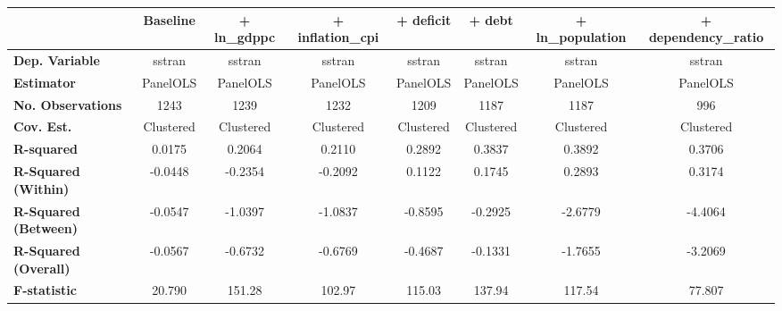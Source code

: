 \begin{center}
\begin{tabular}{lccccccc}
\toprule
                                   & \textbf{Baseline} & \textbf{+ ln\_gdppc} & \textbf{+ inflation\_cpi} & \textbf{+ deficit} & \textbf{+ debt} & \textbf{+ ln\_population} & \textbf{+ dependency\_ratio}  \\
\midrule
\textbf{Dep. Variable}             &       sstran      &        sstran        &           sstran          &       sstran       &      sstran     &           sstran          &            sstran             \\
\textbf{Estimator}                 &      PanelOLS     &       PanelOLS       &          PanelOLS         &      PanelOLS      &     PanelOLS    &          PanelOLS         &           PanelOLS            \\
\textbf{No. Observations}          &        1243       &         1239         &            1232           &        1209        &       1187      &            1187           &             996               \\
\textbf{Cov. Est.}                 &     Clustered     &      Clustered       &         Clustered         &     Clustered      &    Clustered    &         Clustered         &          Clustered            \\
\textbf{R-squared}                 &       0.0175      &        0.2064        &           0.2110          &       0.2892       &      0.3837     &           0.3892          &            0.3706             \\
\textbf{R-Squared (Within)}        &      -0.0448      &       -0.2354        &          -0.2092          &       0.1122       &      0.1745     &           0.2893          &            0.3174             \\
\textbf{R-Squared (Between)}       &      -0.0547      &       -1.0397        &          -1.0837          &      -0.8595       &     -0.2925     &          -2.6779          &           -4.4064             \\
\textbf{R-Squared (Overall)}       &      -0.0567      &       -0.6732        &          -0.6769          &      -0.4687       &     -0.1331     &          -1.7655          &           -3.2069             \\
\textbf{F-statistic}               &       20.790      &        151.28        &           102.97          &       115.03       &      137.94     &           117.54          &            77.807             \\

\end{tabular}
\end{center}
